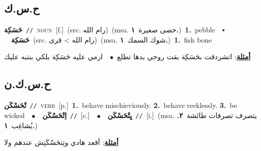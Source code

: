 \documentclass[10pt,a4paper,twoside]{article} %
\begin{document}
\begin{multicols}{2}
\vspace{-3mm}
\subsection*{\color{blue}\foreignlanguage{arabic}{ح.س.ك}\color{blue}{}} 

{\setlength\topsep{0pt}\textbf{\foreignlanguage{arabic}{حَسَكِة}}\ {\color{gray}\texttt{//}\color{black}}\ \textsc{noun}\ [f.]\ (src. \color{gray}\foreignlanguage{arabic}{رام الله}\color{black})\ \color{gray}(msa. \foreignlanguage{arabic}{حصى صغيرة}~\foreignlanguage{arabic}{\textbf{١.}})\color{black}\ \textbf{1.}~pebble\ \ $\smblkdiamond$\ \ \setlength\topsep{0pt}\textbf{\foreignlanguage{arabic}{حَسَكِة}}\ (src. \color{gray}\foreignlanguage{arabic}{رام الله > قرى}\color{black})\ \color{gray}(msa. \foreignlanguage{arabic}{شوك السمك}~\foreignlanguage{arabic}{\textbf{١.}})\color{black}\ \textbf{1.}~fish bone\  \begin{flushright}\color{gray}\foreignlanguage{arabic}{\textbf{\underline{\foreignlanguage{arabic}{أمثلة}}}: اتشردقت بحَسَكِة بقت روحي بدها تطلع\ $\bullet$\ \  ارمي عليه حَسَكِة بلكي بنتبه عليك}\end{flushright}\color{black}} \vspace{2mm}

\vspace{-3mm}
\subsection*{\color{blue}\foreignlanguage{arabic}{ح.س.ك.ن}\color{blue}{}} 

{\setlength\topsep{0pt}\textbf{\foreignlanguage{arabic}{تْحَسْكَن}}\ {\color{gray}\texttt{//}\color{black}}\ \textsc{verb}\ [p.]\ \textbf{1.}~behave mischieviously.  \textbf{2.}~behave recklessly.  \textbf{3.}~be wicked\ \ $\bullet$\ \ \setlength\topsep{0pt}\textbf{\foreignlanguage{arabic}{اِتْحَسْكَن}}\ {\color{gray}\texttt{//}\color{black}}\ [c.]\ \ $\bullet$\ \ \setlength\topsep{0pt}\textbf{\foreignlanguage{arabic}{يِتْحَسْكَن}}\ {\color{gray}\texttt{//}\color{black}}\ [i.]\ \color{gray}(msa. \foreignlanguage{arabic}{يتصرف تصرفات طائشة}~\foreignlanguage{arabic}{\textbf{٢.}}  \foreignlanguage{arabic}{يُشاغِب}~\foreignlanguage{arabic}{\textbf{١.}})\color{black}\  \begin{flushright}\color{gray}\foreignlanguage{arabic}{\textbf{\underline{\foreignlanguage{arabic}{أمثلة}}}: أقعد هادي وتِتحَسْكَنِش عندهم ولا}\end{flushright}\color{black}} \vspace{2mm}


\end{multicols}
\end{document}
